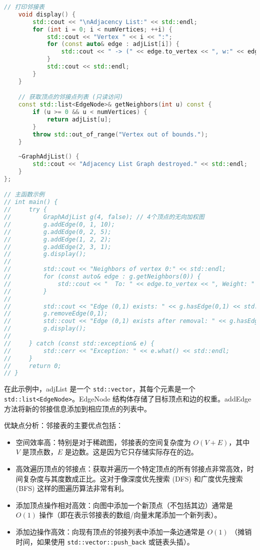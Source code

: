\begin{lstlisting}[language=cpp]
    // 打印邻接表
    void display() {
        std::cout << "\nAdjacency List:" << std::endl;
        for (int i = 0; i < numVertices; ++i) {
            std::cout << "Vertex " << i << ":";
            for (const auto& edge : adjList[i]) {
                std::cout << " -> (" << edge.to_vertex << ", w:" << edge.weight << ")";
            }
            std::cout << std::endl;
        }
    }

    // 获取顶点的邻接点列表 (只读访问)
    const std::list<EdgeNode>& getNeighbors(int u) const {
        if (u >= 0 && u < numVertices) {
            return adjList[u];
        }
        throw std::out_of_range("Vertex out of bounds.");
    }
    
    ~GraphAdjList() {
        std::cout << "Adjacency List Graph destroyed." << std::endl;
    }
};

// 主函数示例
// int main() {
//     try {
//         GraphAdjList g(4, false); // 4个顶点的无向加权图
//         g.addEdge(0, 1, 10);
//         g.addEdge(0, 2, 5);
//         g.addEdge(1, 2, 2);
//         g.addEdge(2, 3, 1);
//         g.display();
// 
//         std::cout << "Neighbors of vertex 0:" << std::endl;
//         for (const auto& edge : g.getNeighbors(0)) {
//             std::cout << "  To: " << edge.to_vertex << ", Weight: " << edge.weight << std::endl;
//         }
// 
//         std::cout << "Edge (0,1) exists: " << g.hasEdge(0,1) << std::endl;
//         g.removeEdge(0,1);
//         std::cout << "Edge (0,1) exists after removal: " << g.hasEdge(0,1) << std::endl;
//         g.display();
// 
//     } catch (const std::exception& e) {
//         std::cerr << "Exception: " << e.what() << std::endl;
//     }
//     return 0;
// }
\end{lstlisting}
在此示例中，adjList 是一个 \lstinline{std::vector}，其每个元素是一个 \lstinline{std::list<EdgeNode>}。EdgeNode 结构体存储了目标顶点和边的权重。addEdge 方法将新的邻接信息添加到相应顶点的列表中。

优缺点分析：邻接表的主要优点包括：

\begin{itemize}
	\item 空间效率高：特别是对于稀疏图，邻接表的空间复杂度为 $O(V+E)$，其中 $V$ 是顶点数，$E$ 是边数。这是因为它只存储实际存在的边。
	\item 高效遍历顶点的邻接点：获取并遍历一个特定顶点的所有邻接点非常高效，时间复杂度与其度数成正比。这对于像深度优先搜索 (DFS) 和广度优先搜索 (BFS) 这样的图遍历算法非常有利。
	\item 添加顶点操作相对高效：向图中添加一个新顶点（不包括其边）通常是 $O(1)$ 操作（即在表示邻接表的数组/向量末尾添加一个新列表）。
	\item 添加边操作高效：向现有顶点的邻接列表中添加一条边通常是 $O(1)$ （摊销时间，如果使用 \lstinline{std::vector::push_back} 或链表头插）。
\end{itemize}

